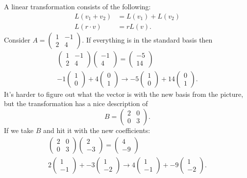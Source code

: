 A linear transformation consists of the following:
\begin{align*}
  L(v_1+v_2)&=L(v_1)+L(v_2)\\
  L(r\cdot v)&=rL(v)
.\end{align*}
  Consider $A = \begin{pmatrix} 1&-1\\2&4 \end{pmatrix} $. If everything is in the standard basis then 
  \begin{align*}
    \begin{pmatrix} 1&-1\\2&4 \end{pmatrix} \begin{pmatrix} -1\\4 \end{pmatrix} =\begin{pmatrix} -5\\14 \end{pmatrix} \\
    -1\begin{pmatrix} 1\\0 \end{pmatrix} + 4\begin{pmatrix} 0\\1 \end{pmatrix} \to -5\begin{pmatrix} 1\\0 \end{pmatrix} +14\begin{pmatrix} 0\\1 \end{pmatrix} 
  .\end{align*}
  It's harder to figure out what the vector is with the new basis from the picture, but the transformation has a nice description of \[
    B=\begin{pmatrix} 2&0\\0&3 \end{pmatrix} 
  .\] 
  If we take $B$ and hit it with the new coefficients:
  \begin{align*}
    \begin{pmatrix} 2&0\\0&3 \end{pmatrix} \begin{pmatrix} 2\\-3 \end{pmatrix} =\begin{pmatrix} 4\\-9 \end{pmatrix} \\
    2\begin{pmatrix} 1\\-1 \end{pmatrix} + -3\begin{pmatrix} 1\\-2 \end{pmatrix} \to 4\begin{pmatrix} 1\\-1 \end{pmatrix} +-9\begin{pmatrix} 1\\-2 \end{pmatrix} 
  .\end{align*}
